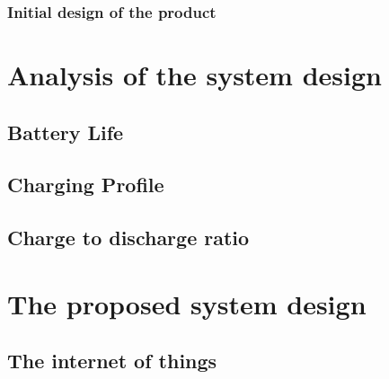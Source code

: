 \documentclass[a4paper, 10pt]{article}
\begin{document}
\subsubsection{Initial design of the product}
\label{indesign}



\section{Analysis of the system design}
\label{sec:analysis}


\subsection{Battery Life}
\label{sec:battery}


\subsection{Charging Profile}
\label{sec:charging}


\subsection{Charge to discharge ratio}
\label{sec:chargedischarge}


\section{The proposed system design}
\label{sec:proposed}



\subsection{The internet of things}
\label{sec:internet}

\end{document}
